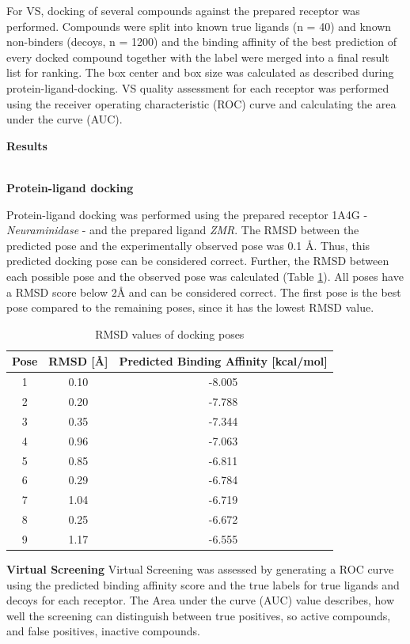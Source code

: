 \documentclass[a4paper,10pt]{article}
\begin{document}
For VS, docking of several compounds against the prepared receptor was performed. Compounds were split into known true ligands (n = 40) and known non-binders (decoys, n = 1200) and the binding affinity of the best prediction of every docked compound together with the label were merged into a final result list for ranking. The box center and box size was calculated as described during protein-ligand-docking.
VS quality assessment for each receptor was performed using the receiver operating characteristic (ROC) curve and calculating the area under the curve (AUC).


\begin{large}
	\vspace{0.5cm}
	\textbf{Results}
\end{large}	\\ [1mm]

\textbf{Protein-ligand docking}

Protein-ligand docking was performed using the prepared receptor 1A4G - \textit{Neuraminidase} - and the prepared ligand \textit{ZMR}. The RMSD between the predicted pose and the experimentally observed pose was 0.1 Å. Thus, this predicted docking pose can be considered correct. Further, the RMSD between each possible pose and the observed pose was calculated (Table \ref{tab:rmsd}). All poses have a RMSD score below 2Å and can be considered correct. The first pose is the best pose compared to the remaining poses, since it has the lowest RMSD value.


\begin{table}[h!]
\centering
\caption{RMSD values of docking poses}
\label{tab:rmsd}
\begin{tabular}{|c|c|c|}
\hline
\textbf{Pose} & \textbf{RMSD [\AA]} & \textbf{Predicted Binding Affinity [kcal/mol]} \\
\hline
1 & 0.10 & -8.005\\
2 & 0.20 & -7.788\\
3 & 0.35 & -7.344\\
4 & 0.96 & -7.063\\
5 & 0.85 & -6.811\\
6 & 0.29 & -6.784 \\
7 & 1.04 & -6.719 \\
8 & 0.25 & -6.672\\
9 & 1.17 & -6.555 \\
\hline
\end{tabular}
\end{table}


\textbf{Virtual Screening}
Virtual Screening was assessed by generating a ROC curve using the predicted binding affinity score and the true labels for true ligands and decoys for each receptor. The Area under the curve (AUC) value describes, how well the screening can distinguish between true positives, so active compounds, and false positives, inactive compounds. 
\end{document}
